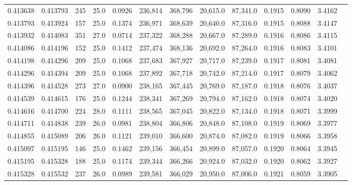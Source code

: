 \begin{tabular}{rrrrrrrrrrrrr}
0.413638 & 0.413793 &   245 & 25.0 &                                     0.0926 & 236,814 & 368,796 &  20,615.0 &  87,341.0 & 0.1915 & 0.8090 & 3.4162 \\
0.413793 & 0.413924 &   157 & 25.0 &                                     0.1374 & 236,971 & 368,639 &  20,640.0 &  87,316.0 & 0.1915 & 0.8088 & 3.4147 \\
0.413932 & 0.414083 &   351 & 27.0 &                                     0.0714 & 237,322 & 368,288 &  20,667.0 &  87,289.0 & 0.1916 & 0.8086 & 3.4115 \\
0.414086 & 0.414196 &   152 & 25.0 &                                     0.1412 & 237,474 & 368,136 &  20,692.0 &  87,264.0 & 0.1916 & 0.8083 & 3.4101 \\
0.414198 & 0.414296 &   209 & 25.0 &                                     0.1068 & 237,683 & 367,927 &  20,717.0 &  87,239.0 & 0.1917 & 0.8081 & 3.4081 \\
0.414296 & 0.414394 &   209 & 25.0 &                                     0.1068 & 237,892 & 367,718 &  20,742.0 &  87,214.0 & 0.1917 & 0.8079 & 3.4062 \\
0.414396 & 0.414528 &   273 & 27.0 &                                     0.0900 & 238,165 & 367,445 &  20,769.0 &  87,187.0 & 0.1918 & 0.8076 & 3.4037 \\
0.414539 & 0.414615 &   176 & 25.0 &                                     0.1244 & 238,341 & 367,269 &  20,794.0 &  87,162.0 & 0.1918 & 0.8074 & 3.4020 \\
0.414616 & 0.414700 &   224 & 28.0 &                                     0.1111 & 238,565 & 367,045 &  20,822.0 &  87,134.0 & 0.1918 & 0.8071 & 3.3999 \\
0.414711 & 0.414838 &   239 & 26.0 &                                     0.0981 & 238,804 & 366,806 &  20,848.0 &  87,108.0 & 0.1919 & 0.8069 & 3.3977 \\
0.414855 & 0.415089 &   206 & 26.0 &                                     0.1121 & 239,010 & 366,600 &  20,874.0 &  87,082.0 & 0.1919 & 0.8066 & 3.3958 \\
0.415097 & 0.415195 &   146 & 25.0 &                                     0.1462 & 239,156 & 366,454 &  20,899.0 &  87,057.0 & 0.1920 & 0.8064 & 3.3945 \\
0.415195 & 0.415328 &   188 & 25.0 &                                     0.1174 & 239,344 & 366,266 &  20,924.0 &  87,032.0 & 0.1920 & 0.8062 & 3.3927 \\
0.415328 & 0.415532 &   237 & 26.0 &                                     0.0989 & 239,581 & 366,029 &  20,950.0 &  87,006.0 & 0.1921 & 0.8059 & 3.3905 \\

\end{tabular}
